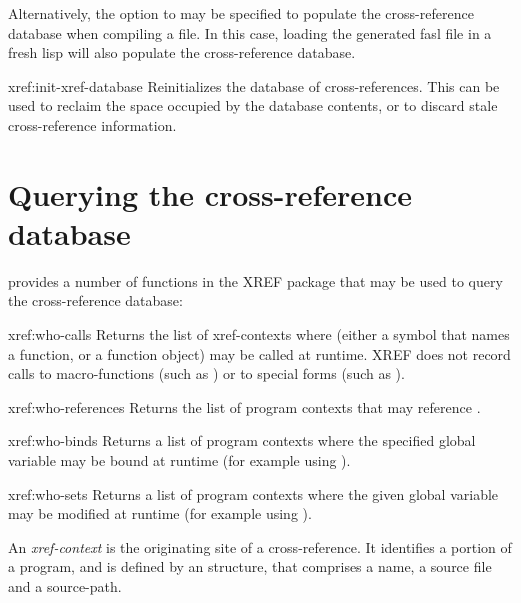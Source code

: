 Alternatively, the  option to  may be
specified to populate the cross-reference database when compiling a
file.  In this case, loading the generated fasl file in a fresh lisp
will also populate the cross-reference database.

\begin{defun}{xref:}{init-xref-database}{}
  Reinitializes the database of cross-references. This can be used to
  reclaim the space occupied by the database contents, or to discard
  stale cross-reference information.
\end{defun}



\section{Querying the cross-reference database}

\cmucl{} provides a number of functions in the XREF package that may
be used to query the cross-reference database:

\begin{defun}{xref:}{who-calls}{\args {}}
   Returns the list of xref-contexts where  (either a
   symbol that names a function, or a function object) may be called
   at runtime. XREF does not record calls to macro-functions (such as
   ) or to special forms (such as ).
\end{defun}

\begin{defun}{xref:}{who-references}{\args {}}
   Returns the list of program contexts that may reference
   . 
\end{defun}

\begin{defun}{xref:}{who-binds}{\args {}}
  Returns a list of program contexts where the specified global
  variable may be bound at runtime (for example using ).
\end{defun}

\begin{defun}{xref:}{who-sets}{\args {}}
  Returns a list of program contexts where the given global variable
  may be modified at runtime (for example using ). 
\end{defun}

An \textit{xref-context} is the originating site of a cross-reference.
It identifies a portion of a program, and is defined by an
 structure, that comprises a name, a source file and a
source-path. 

